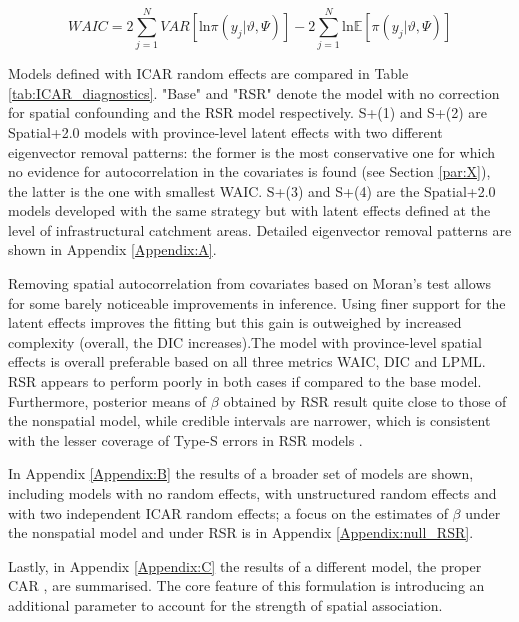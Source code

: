 \documentclass[openany]{book}
\begin{document}
$$
WAIC = 2 \sum_{j=1}^N VAR[\mathrm{ln} \pi(y_j |\vartheta, \Psi)]
- 2 \sum_{j=1}^N  \mathrm{ln} \mathbb{E}[\pi(y_j | \vartheta, \Psi)]
$$


Models defined with ICAR random effects are compared in Table \ref{tab:ICAR_diagnostics}. "Base" and "RSR" denote the model with no correction for spatial confounding and the RSR model respectively.
S+(1) and S+(2) are Spatial+2.0 models with province-level latent effects with two different eigenvector removal patterns: the former is the most conservative one for which no evidence for autocorrelation in the covariates is found (see Section \ref{par:X}), the latter is the one with smallest WAIC.
S+(3) and S+(4) are the Spatial+2.0 models developed with the same strategy but with latent effects defined at the level of infrastructural catchment areas. Detailed eigenvector removal patterns are shown in Appendix \ref{Appendix:A}.

Removing spatial autocorrelation from covariates based on Moran's test allows for some barely noticeable improvements in inference. Using finer support for the latent effects improves the fitting but this gain is outweighed by increased complexity (overall, the DIC increases).The model with province-level spatial effects is overall preferable based on all three metrics WAIC, DIC and LPML.
%
RSR appears to perform poorly in both cases if compared to the base model. Furthermore, posterior means of $\beta$ obtained by RSR result quite close to those of the nonspatial model, while credible intervals are narrower, which is consistent with the lesser coverage of Type-S errors in RSR models \citep{Khan}. 

In Appendix \ref{Appendix:B} the results of a broader set of models are shown, including models with no random effects, with unstructured random effects and with two independent ICAR random effects; a focus on the estimates of $\beta$ under the nonspatial model and under RSR is in Appendix \ref{Appendix:null_RSR}. 

Lastly, in Appendix \ref{Appendix:C} the results of a different model, the proper CAR \citep{PCAR_Gelfand}, are summarised. The core feature of this formulation is introducing an additional parameter to account for the strength of spatial association.
\end{document}
